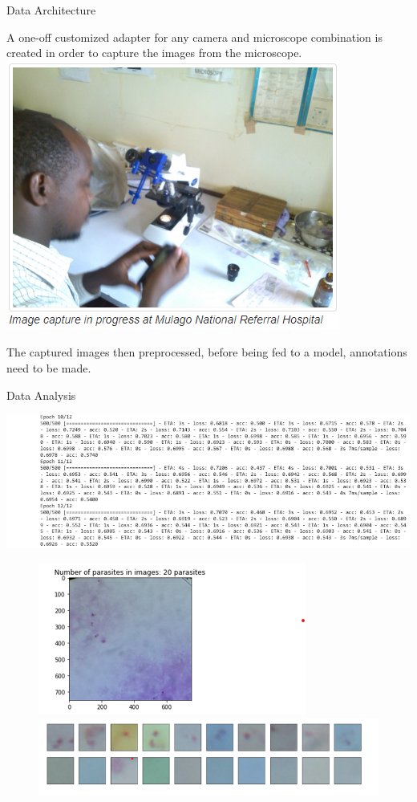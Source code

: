 \documentclass{beamer}
\begin{document}
\begin{frame}[t]{Data Architecture}
	\begin{block}{}\vspace{2pt}\small
	A one-off customized adapter for any camera and microscope combination is created in order to capture the images from the microscope.\\
	 
	\includegraphics[scale = 0.4]{im_cap.png}
	
	The captured images then preprocessed, before being fed to a model, annotations need to be made. 
\end{block}
\end{frame}

\begin{frame}[t]{Data Analysis}
		\begin{block}{\color{red}{Model Performance}}
		\includegraphics[scale = 0.5]{cnn_model.png}
		\begin{figure}[H]
			\begin{minipage}{\textwidth}
				\centering
				\includegraphics[width=.4\textwidth]{para_in_image.png}
				\includegraphics[width=.5\textwidth]{parasites.png}
				\label{fig:qq_plot}
			\end{minipage}\\[1em]
		\end{figure}
	\end{block}
\end{frame}
	
\end{document}
